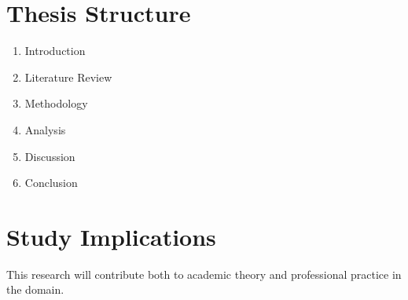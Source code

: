\documentclass[journal,onecolumn, compsoc]{IEEEtran}
\begin{document}
\section{Thesis Structure}
\begin{enumerate}
    \item Introduction
    \item Literature Review
    \item Methodology
    \item Analysis
    \item Discussion
    \item Conclusion
\end{enumerate}

\section{Study Implications}
This research will contribute both to academic theory and professional practice in the domain.



\end{document}
